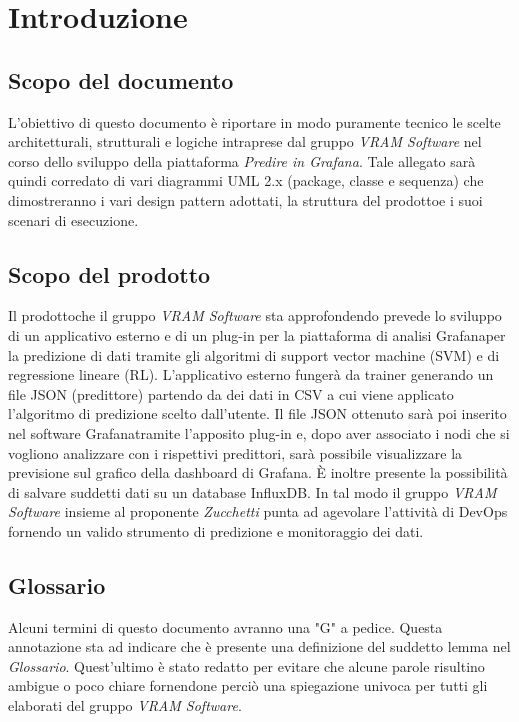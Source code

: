 \section{Introduzione}
    \subsection{Scopo del documento}
        L'obiettivo di questo documento è riportare in modo puramente tecnico le scelte architetturali, strutturali e logiche intraprese dal gruppo \textit{VRAM Software} nel corso dello sviluppo della piattaforma \textit{Predire in Grafana}\glo. Tale allegato sarà quindi corredato di vari diagrammi UML 2.x (package, classe e sequenza) che dimostreranno i vari design pattern adottati, la struttura del prodotto\glosp e i suoi scenari di esecuzione.
    \subsection{Scopo del prodotto}
        Il prodotto\glosp che il gruppo \textit{VRAM Software} sta approfondendo prevede lo sviluppo di un applicativo esterno e di un plug-in per la piattaforma di analisi Grafana\glosp per la predizione di dati tramite gli algoritmi di support vector machine (SVM\glo) e di regressione lineare (RL\glo). L'applicativo esterno fungerà da trainer generando un file JSON (predittore) partendo da dei dati in CSV a cui viene applicato l'algoritmo di predizione scelto dall'utente. Il file JSON ottenuto sarà poi inserito nel software Grafana\glosp tramite l'apposito plug-in e, dopo aver associato i nodi che si vogliono analizzare con i rispettivi predittori, sarà possibile visualizzare la previsione sul grafico della dashboard di Grafana\glo. È inoltre presente la possibilità di salvare suddetti dati su un database InfluxDB. In tal modo il gruppo \textit{VRAM Software} insieme al proponente \textit{Zucchetti} punta ad agevolare l'attività di DevOps fornendo un valido strumento di predizione e monitoraggio dei dati.
    \subsection{Glossario}
        Alcuni termini di questo documento avranno una "G" a pedice. Questa annotazione sta ad indicare che è presente una definizione del suddetto lemma nel \textit{Glossario}. Quest'ultimo è stato redatto per evitare che alcune parole risultino ambigue o poco chiare fornendone perciò una spiegazione univoca per tutti gli elaborati del gruppo \textit{VRAM Software}.
